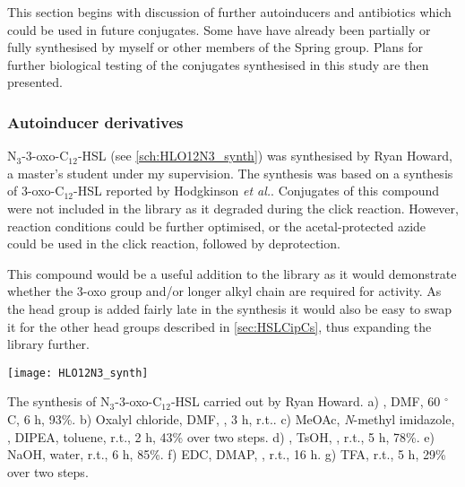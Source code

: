 

This section begins with discussion of further autoinducers and antibiotics which could be used in future conjugates. 
Some have have already been partially or fully synthesised by myself or other members of the Spring group.
Plans for further biological testing of the conjugates synthesised in this study are then presented.

\subsubsection{Autoinducer derivatives}


N$_3$-3-oxo-C$_{12}$-HSL  (see \ref{sch:HLO12N3_synth}) was synthesised by Ryan Howard, a master's student under my supervision. The synthesis was based on a synthesis of 3-oxo-C$_{12}$-HSL  reported by Hodgkinson \textit{et al.}\cite{Hodgkinson2011}. 
Conjugates of this compound were not included in the library as it degraded during the click reaction. However, reaction conditions could be further optimised, or the acetal-protected azide  could be used in the click reaction, followed by deprotection.

This compound would be a useful addition to the library as it would demonstrate whether the 3-oxo group and/or longer alkyl chain are required for activity. As the head group is added fairly late in the synthesis it would also be easy to swap it for the other head groups described in \ref{sec:HSLCipCs}, thus expanding the library further.

\begin{scheme}[H]
	\begin{center}
		\texttt{[image: HLO12N3\_synth]}
		\caption{The synthesis of N$_3$-3-oxo-C$_{12}$-HSL  carried out by Ryan Howard.
		a) , DMF, 60 $^{\circ}$C, 6 h, 93\%.
		b) Oxalyl chloride, DMF, , 3 h, r.t..
		c) MeOAc, \textit{N}-methyl imidazole, , DIPEA, toluene, r.t., 2 h, 43\% over two steps.
		d) , TsOH, , r.t., 5 h, 78\%.
		e) NaOH, water, r.t., 6 h, 85\%.
		f) EDC, DMAP, , r.t., 16 h.
		g) TFA, r.t., 5 h, 29\% over two steps.
		\label{sch:HLO12N3_synth}}
	\end{center}
\end{scheme}

